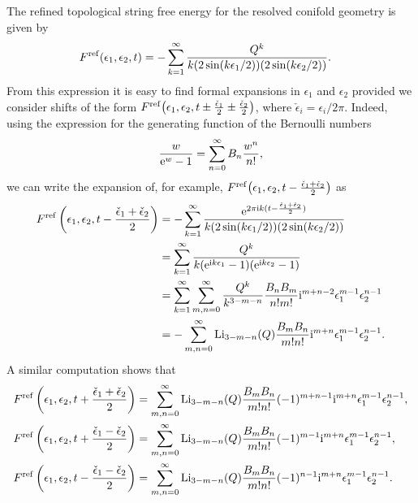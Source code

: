 \documentclass[pdftex]{sigma}
\numberwithin{equation}{section}
\begin{document}
The refined topological string free energy for the resolved conifold geometry is given by~\cite{IKV}
\begin{equation*}
\begin{split}
F^{{\rm ref}}(\epsilon_1,\epsilon_2,t) &=
 -\sum_{k=1}^{\infty} \frac{Q^k}{k(2 \sin (k\epsilon_1/2)) (2\sin (k\epsilon_2/2))}.
\end{split}
\end{equation*}
From this expression it is easy to find formal expansions in $\epsilon_1$ and $\epsilon_2$ provided we consider shifts of the form $F^{\rm ref}\big(\epsilon_1,\epsilon_2,t\pm \frac{\check\epsilon_1}{2} \pm \frac{\check\epsilon_2}{2}\big)$, where $\check\epsilon_i=\epsilon_i/2\pi$. Indeed, using the expression for the generating function of the Bernoulli numbers
\begin{equation}\label{eq:Bernoulligen}
\frac{w}{{\rm e}^w-1} = \sum_{n=0}^{\infty} B_n \frac{w^n}{n!},
\end{equation}
we can write the expansion of, for example, $F^{\rm ref}\big(\epsilon_1,\epsilon_2,t- \frac{\check\epsilon_1+\check\epsilon_2}{2}\big)$ as
\begin{align}
 F^{\rm ref}\left(\epsilon_1,\epsilon_2,t- \frac{\check\epsilon_1+\check\epsilon_2}{2}\right)&= -\sum_{k=1}^{\infty} \frac{{\rm e}^{2\pi \mathrm{i} k (t-\frac{\check\epsilon_1+\check\epsilon_2}{2} )}}{k(2 \sin (k\epsilon_1/2)) (2\sin (k\epsilon_2/2))} \nonumber\\
 &=\sum_{k=1}^{\infty}\frac{Q^k}{k({\rm e}^{\mathrm{i} k\epsilon_1} -1)({\rm e}^{\mathrm{i} k\epsilon_2} -1)}\nonumber\\
 &= \sum_{k=1}^{\infty} \sum_{m,n=0}^{\infty}\frac{Q^k}{k^{3-m-n}} \frac{B_n B_m}{n! m!} \mathrm{i}^{m+n-2} \epsilon_1^{m-1} \epsilon_2^{n-1} \nonumber\\
 &=-\sum_{m,n=0}^{\infty} {\rm Li}_{3-m-n}(Q) \frac{B_m B_n}{m! n!} \mathrm{i}^{m+n} \epsilon_1^{m-1} \epsilon_2^{n-1}.\label{refshifexp1}
\end{align}
A similar computation shows that
\begin{align}
 F^{\rm ref}\left(\epsilon_1,\epsilon_2,t+ \frac{\check\epsilon_1+\check\epsilon_2}{2}\right)&=\sum_{m,n=0}^{\infty} {\rm Li}_{3-m-n}(Q) \frac{B_m B_n}{m! n!} (-1)^{m+n-1}\mathrm{i}^{m+n} \epsilon_1^{m-1} \epsilon_2^{n-1},\nonumber\\
 F^{\rm ref}\left(\epsilon_1,\epsilon_2,t+ \frac{\check\epsilon_1-\check\epsilon_2}{2} \right)&=\sum_{m,n=0}^{\infty} {\rm Li}_{3-m-n}(Q) \frac{B_m B_n}{m! n!} (-1)^{m-1}\mathrm{i}^{m+n} \epsilon_1^{m-1} \epsilon_2^{n-1},\nonumber\\
 F^{\rm ref}\left(\epsilon_1,\epsilon_2,t- \frac{\check\epsilon_1-\check\epsilon_2}{2}\right)&=\sum_{m,n=0}^{\infty} {\rm Li}_{3-m-n}(Q) \frac{B_m B_n}{m! n!} (-1)^{n-1}\mathrm{i}^{m+n} \epsilon_1^{m-1} \epsilon_2^{n-1}.\label{refshifexp2}
 \end{align}
\end{document}

